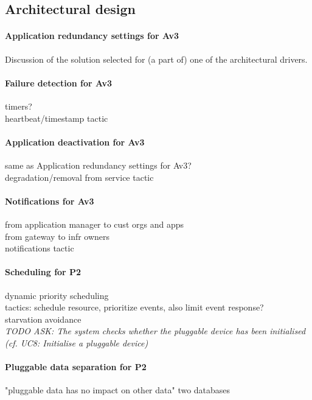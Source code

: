 \subsection{Architectural design}
    \paragraph{Application redundancy settings for Av3}
    Discussion of the solution selected for (a part of) one of the architectural
    drivers.

    \paragraph{Failure detection for Av3}
    timers? \\
    heartbeat/timestamp tactic

    \paragraph{Application deactivation for Av3}
    same as Application redundancy settings for Av3? \\
    degradation/removal from service tactic

    \paragraph{Notifications for Av3}
    from application manager to cust orgs and apps \\
    from gateway to infr owners \\
    notifications tactic

    \paragraph{Scheduling for P2}
    dynamic priority scheduling \\
    tactics: schedule resource, prioritize events, also limit event response?\\
    starvation avoidance \\
    \textit{TODO ASK: The  system  checks  whether  the  pluggable  device  
    has  been  initialised (cf. UC8: Initialise  a pluggable device)}

    \paragraph{Pluggable data separation for P2}
    "pluggable data has no impact on other data"
    two databases

